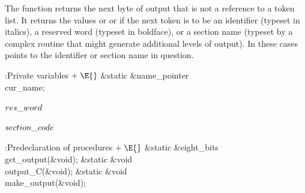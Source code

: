 The  function returns the next byte of output that
is not a
reference to a token list. It returns the values  or 
or  if the next token is to be an identifier (typeset in
italics), a reserved word (typeset in boldface), or a section name (typeset
by a complex routine that might generate additional levels of output).
In these cases  points to the identifier or section name in
question.

\Y\B\4:Private variables\X${}\mathrel+\E{}$\6
\&{static} \&{name\_pointer} \\{cur\_name};\par
\fi

\B\D$\\{res\_word}$ \5
\par
\B\4\D$\\{section\_code}$ \5
\par
\Y\B\4:Predeclaration of procedures\X${}\mathrel+\E{}$\6
\&{static} \&{eight\_bits} \\{get\_output}(\&{void});\6
\&{static} \&{void} \\{output\_C}(\&{void});\6
\&{static} \&{void} \\{make\_output}(\&{void});\par
\fi

